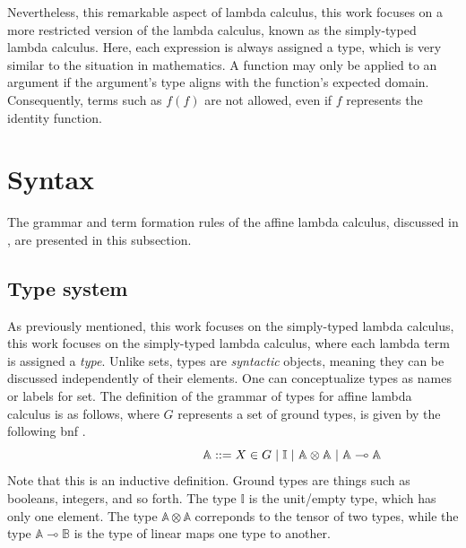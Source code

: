 Nevertheless, this remarkable aspect of lambda calculus, this work focuses on a more restricted version of the lambda calculus, known as the simply-typed lambda calculus. Here, each expression is always assigned a type, which is very similar to the situation in mathematics. A function may only be applied to an argument if the argument's type aligns with the function's expected domain. Consequently, terms such as $f(f)$ are not allowed, even if $f$ represents the identity function.





\section{Syntax}

The grammar and term formation rules of the affine lambda calculus, discussed in \cite{dahlqvist2022syntactic}, are presented in this subsection.

\subsection{Type system}

As previously mentioned, this work focuses on the simply-typed lambda calculus, this work focuses on the simply-typed lambda calculus, where each lambda term is assigned a \emph{type}. Unlike sets, types are \emph{syntactic} objects, meaning they can be discussed independently of their elements. One can conceptualize types as names or labels for set. The definition of the grammar of types for affine lambda calculus is as follows, where $G$ represents a set of ground types, is given by the following \acrfull{bnf} \cite{backus1960report}.
\begin{equation} \label{eq:grammartypes}
\centering
\hspace{95pt} \mathbb{A} ::= X \in G \hspace{3 pt} \vert \hspace{3 pt} \mathbb{I}  \hspace{3 pt}  \vert \hspace{3 pt} \mathbb{A}  \otimes  \mathbb{A} \hspace{3 pt} \vert  \hspace{3 pt}  \mathbb{A} \multimap  \mathbb{A}
\end{equation}
Note that this is an inductive definition. Ground types are things such as booleans, integers, and so forth. The type $\mathbb{I}$ is the unit/empty type, which has only one element. The type $\mathbb{A} \otimes \mathbb{A}$ correponds to the tensor of two types, while the type $\mathbb{A} \multimap \mathbb{B}$ is the type of linear maps one type to another.

